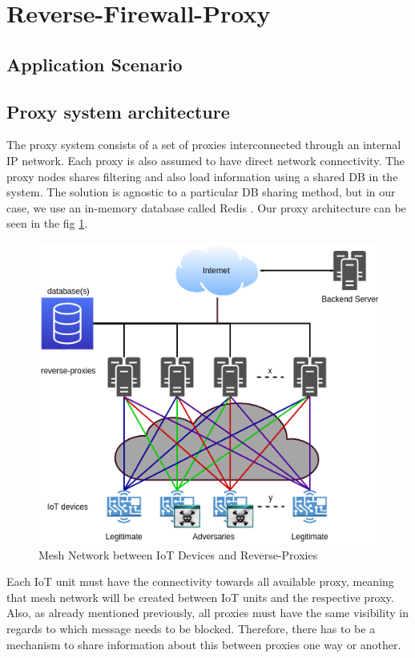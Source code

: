 \documentclass[sigplan,screen]{acmart}
\begin{document}
\section{Reverse-Firewall-Proxy}
\subsection{Application Scenario}

\subsection{Proxy system architecture}
The proxy system consists of a set of proxies interconnected through an internal IP network. Each proxy is also assumed to have direct network connectivity. The proxy nodes shares filtering and also load information using a shared DB in the system. The solution is agnostic to a particular DB sharing method, but in our case, we use an in-memory database called Redis \cite{redis}. Our proxy architecture can be seen in the fig \ref{proxies}.

\begin{figure}[htbp]
\centerline{\includegraphics[scale=0.35]{pic/proxies.png}}
\caption{Mesh Network between IoT Devices and Reverse-Proxies}
\label{proxies}
\end{figure}

Each IoT unit must have the connectivity towards all available proxy, meaning that mesh network will be created between IoT units and the respective proxy. Also, as already mentioned previously, all proxies must have the same visibility in regards to which message needs to be blocked. Therefore, there has to be a mechanism to share information about this between proxies one way or another. 
\end{document}
